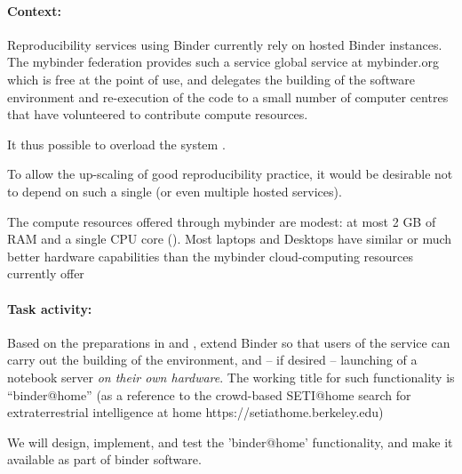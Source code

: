 \begin{task}[
  title=Binder@Home,
  id=binder-at-home,
  lead=MP,
  PM=1,
  wphases={0-36},
  partners={SRL}
]

\paragraph*{Context:} Reproducibility services using Binder currently rely on hosted Binder instances.
The mybinder federation provides such a service global service at mybinder.org
which is free at
the point of use, and delegates the building of the software environment and
re-execution of the code to a small number of computer centres that have
volunteered to contribute compute resources.

It thus possible to overload the system .

To allow the up-scaling of good reproducibility practice, it would be
desirable not to depend on such a single (or even multiple hosted services).
  
The compute resources offered through mybinder are modest: at most 2 GB of RAM
and a single CPU core ().
Most laptops and Desktops have similar or much better hardware capabilities than
the mybinder cloud-computing resources currently offer
  
\paragraph*{Task activity:} Based on the preparations in  and
, extend Binder so that users of the service can
carry out the building of the environment, and -- if desired -- launching of a
notebook server \emph{on their own hardware}. The working title for such
functionality is ``binder@home'' (as a reference to the crowd-based SETI@home search for
extraterrestrial intelligence at home https://setiathome.berkeley.edu)
  
We will design, implement, and test the 'binder@home' functionality, and make it
available as part of binder software.

\end{task}
